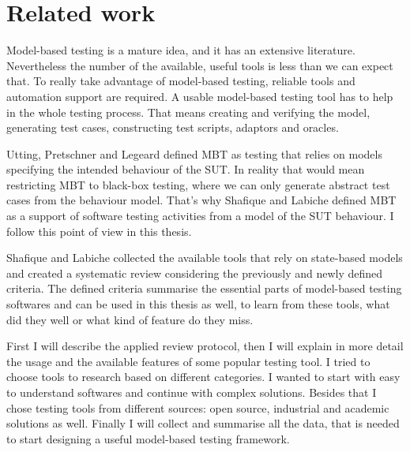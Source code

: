 \chapter{Related work}
\label{cha:relatedwork}

Model-based testing is a mature idea, and it has an extensive literature. Nevertheless the number of the available, useful tools is less than we can expect that. To really take advantage of model-based testing, reliable tools and automation support are required. A usable model-based testing tool has to help in the whole testing process. That means creating and verifying the model, generating test cases, constructing test scripts, adaptors and oracles.

Utting, Pretschner and Legeard \cite{taxonomy} defined MBT as testing that relies on models specifying the intended behaviour of the SUT. In reality that would mean restricting MBT to black-box testing, where we can only generate abstract test cases from the behaviour model. That's why Shafique and Labiche defined MBT as a support of software testing activities from a model of the SUT behaviour. I follow this point of view in this thesis.

Shafique and Labiche \cite{toolsreview} collected the available tools that rely on state-based models and created a systematic review considering the previously and newly defined criteria. The defined criteria summarise the essential parts of model-based testing softwares and can be used in this thesis as well, to learn from these tools, what did they well or what kind of feature do they miss.

First I will describe the applied review protocol, then I will explain in more detail the usage and the available features of some popular testing tool. I tried to choose tools to research based on different categories. I wanted to start with easy to understand softwares and continue with complex solutions. Besides that I chose testing tools from different sources: open source, industrial and academic solutions as well. Finally I will collect and summarise all the data, that is needed to start designing a useful model-based testing framework.

